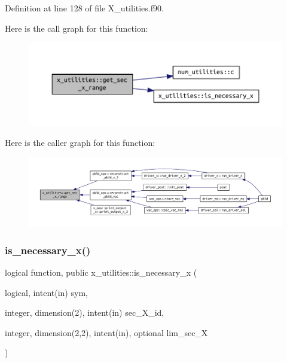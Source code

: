 Definition at line 128 of file X\+\_\+utilities.\+f90.

Here is the call graph for this function\+:\nopagebreak
\begin{figure}[H]
\begin{center}
\leavevmode
\includegraphics[width=350pt]{namespacex__utilities_a6072ddd1fd230758795ff320c75a1f6a_cgraph}
\end{center}
\end{figure}
Here is the caller graph for this function\+:\nopagebreak
\begin{figure}[H]
\begin{center}
\leavevmode
\includegraphics[width=350pt]{namespacex__utilities_a6072ddd1fd230758795ff320c75a1f6a_icgraph}
\end{center}
\end{figure}
\mbox{\label{namespacex__utilities_a689aca7fedb49c43c5a65a18d557259f}} 
\subsubsection{\texorpdfstring{is\+\_\+necessary\+\_\+x()}{is\_necessary\_x()}}
{\footnotesize\ttfamily logical function, public x\+\_\+utilities\+::is\+\_\+necessary\+\_\+x (\begin{DoxyParamCaption}\item[{logical, intent(in)}]{sym,  }\item[{integer, dimension(2), intent(in)}]{sec\+\_\+\+X\+\_\+id,  }\item[{integer, dimension(2,2), intent(in), optional}]{lim\+\_\+sec\+\_\+X }\end{DoxyParamCaption})}



